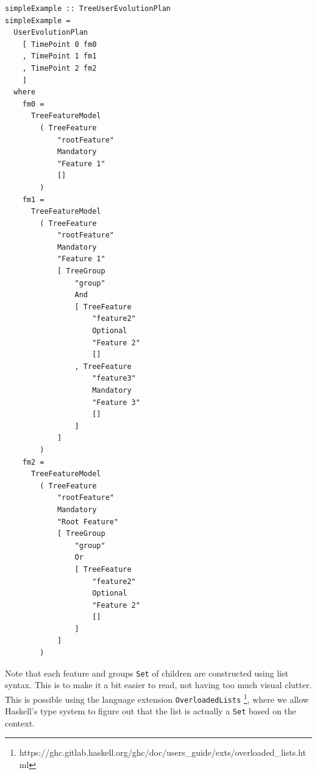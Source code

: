 \documentclass[a4paper,english]{ifimaster}
\begin{document}
\begin{verbatim}
simpleExample :: TreeUserEvolutionPlan
simpleExample =
  UserEvolutionPlan
    [ TimePoint 0 fm0
    , TimePoint 1 fm1
    , TimePoint 2 fm2
    ]
  where
    fm0 =
      TreeFeatureModel
        ( TreeFeature
            "rootFeature"
            Mandatory
            "Feature 1"
            []
        )
    fm1 =
      TreeFeatureModel
        ( TreeFeature
            "rootFeature"
            Mandatory
            "Feature 1"
            [ TreeGroup
                "group"
                And
                [ TreeFeature
                    "feature2"
                    Optional
                    "Feature 2"
                    []
                , TreeFeature
                    "feature3"
                    Mandatory
                    "Feature 3"
                    []
                ]
            ]
        )
    fm2 =
      TreeFeatureModel
        ( TreeFeature
            "rootFeature"
            Mandatory
            "Root Feature"
            [ TreeGroup
                "group"
                Or
                [ TreeFeature
                    "feature2"
                    Optional
                    "Feature 2"
                    []
                ]
            ]
        )
\end{verbatim}

Note that each feature and groups \texttt{Set} of children are constructed using list syntax. This is to make it a bit easier to read, not having too much visual clutter. This is possible using the language extension \texttt{OverloadedLists} \footnote{https://ghc.gitlab.haskell.org/ghc/doc/users\_guide/exts/overloaded\_lists.html}, where we allow Haskell's type system to figure out that the list is actually a \texttt{Set} based on the context.
\end{document}
